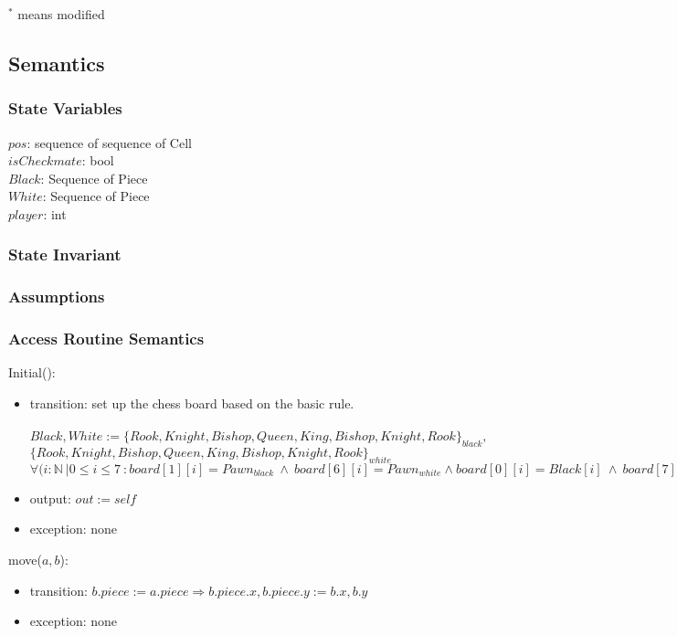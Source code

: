 \documentclass[12pt]{article}
\begin{document}
$^{*}$ means modified

\subsection* {Semantics}

\subsubsection* {State Variables}

$pos$: sequence of sequence of Cell\\
$isCheckmate$: bool\\
$Black$: Sequence of Piece\\
$White$: Sequence of Piece\\
$player$: int

\subsubsection* {State Invariant}

\subsubsection* {Assumptions}

\subsubsection* {Access Routine Semantics}

Initial():
\begin{itemize}
\item transition: set up the chess board based on the basic rule. \\
\\
$Black, White := \{Rook, Knight, Bishop, Queen, King, Bishop, Knight, Rook\}_{black}, $\\
$\{Rook, Knight, Bishop, Queen, King, Bishop, Knight, Rook\}_{white}$\\
$\forall(i : \mathbb{N}\ | 0 \leq i \leq 7 \ : board[1][i] = Pawn_{black} \ \wedge \ board[6][i] = Pawn_{white} \wedge board[0][i] = Black[i] \ \wedge \ board[7][i] = White[i]$
\item output: $out := \mathit{self}$
\item exception: none
\end{itemize}

\noindent move($a, b$):
\begin{itemize}
\item transition: $b.piece := a.piece \Rightarrow b.piece.x , b.piece.y := b.x, b.y$
\item exception: none
\end{itemize}
\end{document}
